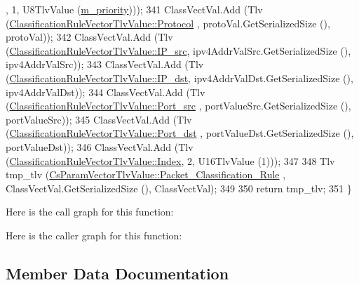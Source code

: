 \begin{DoxyCode}
      , 1, U8TlvValue (\hyperlink{classns3_1_1IpcsClassifierRecord_ac92730633e3a9b2143ddc48140780be8}{m\_priority})));
341   ClassVectVal.Add (Tlv (\hyperlink{classns3_1_1ClassificationRuleVectorTlvValue_a9945c44c631de44d3b9c8dc9560cb820ac596932971436a37dd565fa950f1e9df}{ClassificationRuleVectorTlvValue::Protocol}
      , protoVal.GetSerializedSize (), protoVal));
342   ClassVectVal.Add (Tlv (\hyperlink{classns3_1_1ClassificationRuleVectorTlvValue_a9945c44c631de44d3b9c8dc9560cb820a25dcc2e936d897953dd8fced923caa83}{ClassificationRuleVectorTlvValue::IP\_src}, 
      ipv4AddrValSrc.GetSerializedSize (), ipv4AddrValSrc));
343   ClassVectVal.Add (Tlv (\hyperlink{classns3_1_1ClassificationRuleVectorTlvValue_a9945c44c631de44d3b9c8dc9560cb820ab9d2ecb509415d656b9fecb6470a11d5}{ClassificationRuleVectorTlvValue::IP\_dst}, 
      ipv4AddrValDst.GetSerializedSize (), ipv4AddrValDst));
344   ClassVectVal.Add (Tlv (\hyperlink{classns3_1_1ClassificationRuleVectorTlvValue_a9945c44c631de44d3b9c8dc9560cb820a9d8e7721917dc3136e20ca00dbe4b0ad}{ClassificationRuleVectorTlvValue::Port\_src}
      , portValueSrc.GetSerializedSize (), portValueSrc));
345   ClassVectVal.Add (Tlv (\hyperlink{classns3_1_1ClassificationRuleVectorTlvValue_a9945c44c631de44d3b9c8dc9560cb820a20c3a1510829e04b8f8857b536b77471}{ClassificationRuleVectorTlvValue::Port\_dst}
      , portValueDst.GetSerializedSize (), portValueDst));
346   ClassVectVal.Add (Tlv (\hyperlink{classns3_1_1ClassificationRuleVectorTlvValue_a9945c44c631de44d3b9c8dc9560cb820a411a276461e9e48f9bc54fecce932f54}{ClassificationRuleVectorTlvValue::Index}, 2,
       U16TlvValue (1)));
347 
348   Tlv tmp\_tlv (\hyperlink{classns3_1_1CsParamVectorTlvValue_a72ca87bab4986bec8ee954c8d223ca2ba56aa6665cbc24e0799ae7c6d056addc8}{CsParamVectorTlvValue::Packet\_Classification\_Rule}
      , ClassVectVal.GetSerializedSize (), ClassVectVal);
349 
350   \textcolor{keywordflow}{return} tmp\_tlv;
351 \}
\end{DoxyCode}


Here is the call graph for this function\+:




Here is the caller graph for this function\+:




\subsection{Member Data Documentation}
